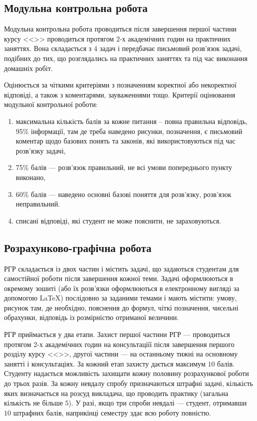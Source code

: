 \documentclass{Syllabus}
\begin{document}
\subsection*{Модульна контрольна робота}


Модульна контрольна робота проводиться після завершення першої частини курсу <<\discipline>> проводиться протягом 2-х академічних годин на практичних заняттях. Вона складається з $4$ задач і передбачає письмовий розв’язок задачі, подібних до тих, що розглядались на практичних заняттях та під час виконання домашніх робіт.

Оцінюється за чіткими критеріями з позначенням коректної або некоректної відповіді, а також з коментарями, зауваженнями тощо. Критерії оцінювання модульної контрольної роботи:
\begin{enumerate}[label=$\bullet$]
\item максимальна кількість балів за кожне питання – повна правильна відповідь, 95\% інформації, там де треба наведено рисунки, позначення, є письмовий коментар щодо базових понять та законів, які використовуються під час розв’язку задачі,
\item 75\% балів --- розв’язок правильний, не всі умови попереднього пункту виконано,
\item 60\% балів --- наведено основні базові поняття для розв’язку, розв’язок неправильний.
\item списані відповіді, які студент не може пояснити, не зараховуються.
\end{enumerate}


\subsection*{Розрахунково-графічна робота}


РГР складається із двох частин і містить задачі, що задаються студентам для самостійної роботи після завершення кожної теми. Задачі оформлюються в окремому зошиті (або їх розв'язки оформлюються в електронному вигляді за допомогою \LaTeX{}) послідовно за заданими темами і мають містити: умову, рисунок там, де необхідно, пояснення до формул, чіткі позначення, чисельні обрахунки, відповідь із розмірністю отриманої величини.

РГР приймається у два етапи. Захист першої частини РГР --- проводиться протягом 2-х академічних годин на консультаціїї після завершення першого розділу курсу <<\discipline>>, другої частини --- на останньому тижні на основному занятті і консультаціях. За кожний етап захисту дається максимум $10$ балів. Студенту надається можливість захищати кожну половину розрахункової роботи до трьох разів. За кожну невдалу спробу призначаються штрафні задачі, кількість яких визначається на розсуд викладача, що проводить практику (загальна кількість не більше $5$). У разі, якщо три спроби невдалі --- студент, отримавши $10$ штрафних балів, наприкінці семестру здає всю роботу повністю.
\end{document}
